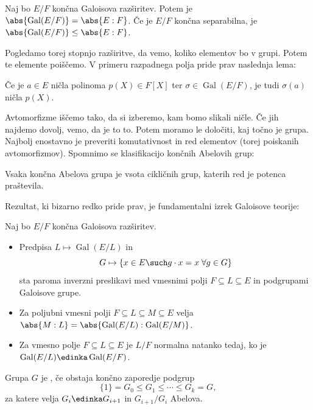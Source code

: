 \begin{trditev}
  Naj bo $E/F$ končna Galoisova razširitev.
  Potem je $\abs{\operatorname{Gal}(E/F)} = \abs{E:F}$.
  Če je $E/F$ končna separabilna, je $\abs{\operatorname{Gal}(E/F)} \le
  \abs{E:F}$.
\end{trditev}

Pogledamo torej stopnjo razširitve, da vemo, koliko elementov bo v grupi.
Potem te elemente poiščemo.
V primeru razpadnega polja pride prav naslednja lema:

\begin{lema}
  Če je $a \in E$ ničla polinoma $p(X) \in F[X]$ ter $\sigma \in
  \operatorname{Gal}(E/F)$, je tudi $\sigma(a)$ ničla $p(X)$.
\end{lema}

Avtomorfizme iščemo tako, da si izberemo, kam bomo slikali ničle.
Če jih najdemo dovolj, vemo, da je to to.
Potem moramo le določiti, kaj točno je grupa.
Najbolj enostavno je preveriti komutativnost in red elementov (torej poiskanih
avtomorfizmov).
Spomnimo se klasifikacijo končnih Abelovih grup:

\begin{izrek}
  Vsaka končna Abelova grupa je vsota cikličnih grup, katerih red je potenca
  praštevila.
\end{izrek}

Rezultat, ki bizarno redko pride prav, je fundamentalni izrek Galoisove teorije:

\begin{izrek}
  Naj bo $E/F$ končna Galoisova razširitev.
  \begin{itemize}
  \item Predpisa $L \mapsto \operatorname{Gal}(E/L)$ in
	\[
	  G \mapsto \{x \in E \such g \cdot x = x \;\forall g \in G\}
	\]
	sta paroma inverzni preslikavi med vmesnimi polji $F \subseteq L \subseteq
	E$ in podgrupami Galoisove grupe.
  \item Za poljubni vmesni polji $F \subseteq L \subseteq M \subseteq E$ velja
	$\abs{M:L} = \abs{\operatorname{Gal}(E/L) : \operatorname{Gal}(E/M)}$.
  \item Za vmesno polje $F \subseteq L \subseteq E$ je $L/F$ normalna natanko
	tedaj, ko je $\operatorname{Gal}(E/L) \edinka \operatorname{Gal}(E/F)$.
  \end{itemize}
\end{izrek}


\begin{definicija}
  Grupa $G$ je , če obstaja končno zaporedje podgrup
  \[
	\{1\} = G_0 \le G_1 \le \cdots \le G_k = G,
  \]
  za katere velja $G_i \edinka G_{i+1}$ in $G_{i+1} / G_i$ Abelova.
\end{definicija}

